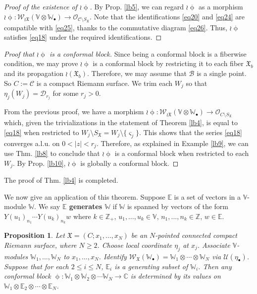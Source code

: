 \documentclass[12pt,a4paper,notitlepage]{article}
\theoremstyle{definition}
\theoremstyle{plain}
\newtheorem{pp}[df]{Proposition}
\newcommand{\fk}{\mathfrak}
\newcommand{\mc}{\mathcal}
\newcommand{\scr}{\mathscr}
\newcommand{\sgm}{\varsigma}
\newcommand{\SX}{{S_{\fk X}}}
\newcommand{\blt}{\bullet}
\newcommand{\Vbb}{\mathbb V}
\newcommand{\Wbb}{\mathbb W}
\newcommand{\Cbb}{\mathbb C}
\newcommand{\Zbb}{\mathbb Z}
\newcommand{\Ebb}{\mathbb E}
\numberwithin{equation}{section}
\begin{document}
\begin{proof}[Proof  of the existence of $\wr\upphi$]
By Prop. \ref{lb5}, we can regard $\wr\upphi$ as a morphism $\wr\upphi:\scr W_{\wr\fk X}(\Vbb\otimes\Wbb_\blt)\rightarrow\scr O_{\mc C\setminus\SX}$. Note that the identifications \eqref{eq20} and \eqref{eq24} are compatible with \eqref{eq25}, thanks to the commutative diagram \eqref{eq26}. Thus, $\wr\upphi$  satisfies \eqref{eq18} under the required identifications.
\end{proof}


\begin{proof}[Proof that $\wr\upphi$ is a conformal block]
Since being a conformal block is a fiberwise condition, we may prove $\wr\upphi$ is a conformal block by restricting it to each fiber $\fk X_b$ and its propagation $\wr(\fk X_b)$. Therefore, we may assume that $\mc B$ is a single point. So $C:=\mc C$ is a compact Riemann surface. We trim each $W_j$ so that $\eta_j(W_j)=\mc D_{r_j}$ for some $r_j>0$.

From the previous proof, we have a morphism $\wr\upphi:\scr W_{\wr\fk X}(\Vbb\otimes\Wbb_\blt)\rightarrow\scr O_{C\setminus\SX}$ which, given the trivializations in the statement of Theorem \ref{lb4}, is equal to \eqref{eq18} when restricted to $W_j\setminus\SX=W_j\setminus\{\sgm_j\}$. This shows that the series \eqref{eq18} converges a.l.u. on $0<|z|<r_j$. Therefore, as explained in Example \ref{lb9}, we can use Thm. \ref{lb8} to conclude that $\wr\upphi$ is a conformal block when restricted to each $W_j$. By Prop. \ref{lb10}, $\wr\upphi$ is globally a conformal block.
\end{proof}


The proof of Thm. \ref{lb4} is completed.

We now give an application of this theorem. Suppose $\Ebb$ is a set of vectors in a $\Vbb$-module $\Wbb$. We say \textbf{$\Ebb$ generates $\Wbb$} if $\Wbb$ is spanned by vectors of the form $Y(u_1)_{n_1}\cdots Y(u_k)_{n_k}w$ where $k\in\Zbb_+$, $u_1,\dots,u_k\in\Vbb$, $n_1,\dots,n_k\in\Zbb$, $w\in\Ebb$. 


\begin{pp}\label{lb12}
Let $\fk X=(C;x_1,\dots,x_N)$ be an $N$-pointed connected compact Riemann surface, where $N\geq 2$. Choose local coordinate $\eta_j$ at $x_j$. Associate $\Vbb$-modules $\Wbb_1,\dots,\Wbb_N$ to $x_1,\dots,x_N$. Identify $\scr W_{\fk X}(\Wbb_\blt)=\Wbb_1\otimes\cdots\otimes\Wbb_N$ via $\mc U(\eta_\blt)$. Suppose that for each $2\leq i\leq N$, $\Ebb_i$ is a generating subset of $\Wbb_i$. Then any conformal block $\upphi:\Wbb_1\otimes\Wbb_2\otimes\cdots\Wbb_N\rightarrow\Cbb$ is determined by its values on $\Wbb_1\otimes\Ebb_2\otimes\cdots\otimes\Ebb_N$.
\end{pp}
\end{document}
